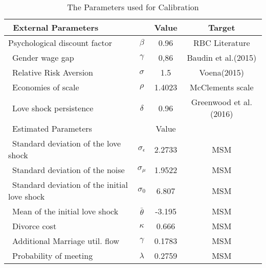 \documentclass[12pt]{article}
\begin{document}
\begin{table}[H]
	\caption{The Parameters used for Calibration} %
	\centering %
	\begin{tabular}{@{} l c c c @{}}  %
		\hline\hline %
		\ External Parameters &  & Value & Target  \\ [0.05ex] %
		\hline %
		\rule{0pt}{2.5ex}
		Psychological discount factor                 & $\beta$              & 0.96   & RBC Literature \\[0.15ex]
		\ Gender wage gap                              & $\gamma$             & 0,86   & Baudin et al.(2015)\\[0.15ex]
		\ Relative Risk Aversion                       & $\sigma$             & 1.5    & Voena(2015) \\[0.15ex]		
		\ Economies of scale                           & $\rho$               & 1.4023 & McClements scale \\[0.15ex]
		\ Love shock persistence                       & $\delta$             & 0.96   & Greenwood et al. (2016) \\[0.15ex]
		\hline \hline%
		\ Estimated Parameters &  & Value &  \\ [0.05ex] %
		\hline
		\ Standard deviation of the love shock         & $\sigma_{\epsilon}$  & 2.2733 & MSM \\[0.15ex]
		\ Standard deviation of the noise              & $\sigma_{\mu}$       & 1.9522 & MSM \\[0.15ex]
		\ Standard deviation of the initial love shock & $\sigma_{0}$         & 6.807  & MSM \\[0.15ex]
		\ Mean of the initial love shock               & $\bar{\theta}$       & -3.195 & MSM \\[0.15ex]
		\ Divorce cost                                 & $\kappa$             & 0.666  & MSM \\[0.15ex]
		\ Additional Marriage util. flow               & $\gamma$             & 0.1783 & MSM \\[0.15ex]
		\ Probability of meeting                       & $\lambda$            & 0.2759 & MSM \\[0.15ex]
		\hline
	\end{tabular}
	\label{table:nonlin} %
\end{table}
\end{document}
